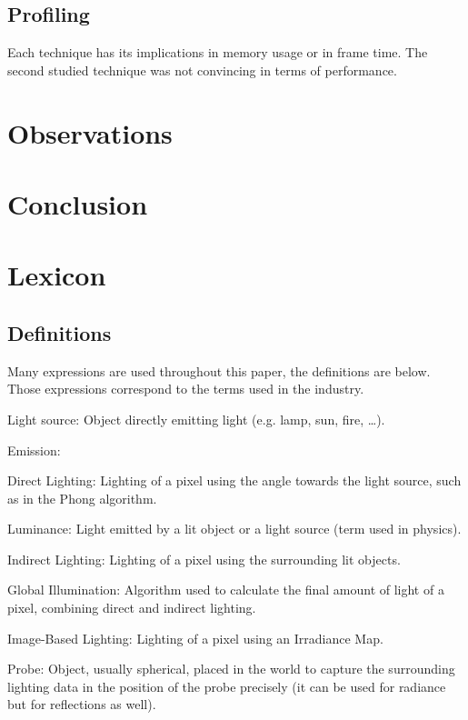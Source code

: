 \documentclass{rapportCS}
\begin{document}
\subsection{Profiling}
Each technique has its implications in memory usage or in frame time.
The second studied technique was not convincing in terms of performance. 


\section{Observations}

\section{Conclusion}

\section*{Lexicon}


\subsection*{Definitions}

Many expressions are used throughout this paper, the definitions are below. Those expressions correspond to the terms used in the industry.

Light source: Object directly emitting light (e.g. lamp, sun, fire, …).

Emission:

Direct Lighting: Lighting of a pixel using the angle towards the light source, such as in the Phong algorithm.

Luminance: Light emitted by a lit object or a light source (term used in physics).

Indirect Lighting: Lighting of a pixel using the surrounding lit objects.

Global Illumination: Algorithm used to calculate the final amount of light of a pixel, combining direct and indirect lighting.

Image-Based Lighting: Lighting of a pixel using an Irradiance Map.

Probe: Object, usually spherical, placed in the world to capture the surrounding lighting data in the position of the probe precisely (it can be used for radiance but for reflections as well).
\end{document}
